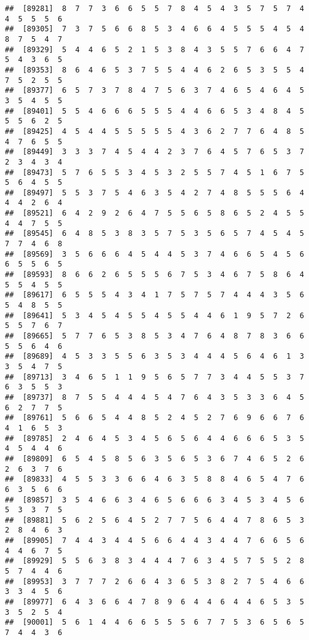 \documentclass[
]{book}
\begin{document}
\begin{verbatim}
##  [89281]  8  7  7  3  6  6  5  5  7  8  4  5  4  3  5  7  5  7  4  4  5  5  5  6
##  [89305]  7  3  7  5  6  6  8  5  3  4  6  6  4  5  5  5  4  5  4  8  7  5  4  7
##  [89329]  5  4  4  6  5  2  1  5  3  8  4  3  5  5  7  6  6  4  7  5  4  3  6  5
##  [89353]  8  6  4  6  5  3  7  5  5  4  4  6  2  6  5  3  5  5  4  7  5  2  5  5
##  [89377]  6  5  7  3  7  8  4  7  5  6  3  7  4  6  5  4  6  4  5  3  5  4  5  5
##  [89401]  5  5  4  6  6  6  5  5  5  4  4  6  6  5  3  4  8  4  5  5  5  6  2  5
##  [89425]  4  5  4  4  5  5  5  5  5  4  3  6  2  7  7  6  4  8  5  4  7  6  5  5
##  [89449]  3  3  3  7  4  5  4  4  2  3  7  6  4  5  7  6  5  3  7  2  3  4  3  4
##  [89473]  5  7  6  5  5  3  4  5  3  2  5  5  7  4  5  1  6  7  5  5  6  4  5  5
##  [89497]  5  5  3  7  5  4  6  3  5  4  2  7  4  8  5  5  5  6  4  4  4  2  6  4
##  [89521]  6  4  2  9  2  6  4  7  5  5  6  5  8  6  5  2  4  5  5  4  4  7  5  5
##  [89545]  6  4  8  5  3  8  3  5  7  5  3  5  6  5  7  4  5  4  5  7  7  4  6  8
##  [89569]  3  5  6  6  6  4  5  4  4  5  3  7  4  6  6  5  4  5  6  6  5  5  6  5
##  [89593]  8  6  6  2  6  5  5  5  6  7  5  3  4  6  7  5  8  6  4  5  5  4  5  5
##  [89617]  6  5  5  5  4  3  4  1  7  5  7  5  7  4  4  4  3  5  6  5  4  8  5  5
##  [89641]  5  3  4  5  4  5  5  4  5  5  4  4  6  1  9  5  7  2  6  5  5  7  6  7
##  [89665]  5  7  7  6  5  3  8  5  3  4  7  6  4  8  7  8  3  6  6  5  5  6  4  6
##  [89689]  4  5  3  3  5  5  6  3  5  3  4  4  4  5  6  4  6  1  3  3  5  4  7  5
##  [89713]  3  4  6  5  1  1  9  5  6  5  7  7  3  4  4  5  5  3  7  6  3  5  5  3
##  [89737]  8  7  5  5  4  4  4  5  4  7  6  4  3  5  3  3  6  4  5  6  2  7  7  5
##  [89761]  5  6  6  5  4  4  8  5  2  4  5  2  7  6  9  6  6  7  6  4  1  6  5  3
##  [89785]  2  4  6  4  5  3  4  5  6  5  6  4  4  6  6  6  5  3  5  4  5  4  4  6
##  [89809]  6  5  4  5  8  5  6  3  5  6  5  3  6  7  4  6  5  2  6  2  6  3  7  6
##  [89833]  4  5  5  3  3  6  6  4  6  3  5  8  8  4  6  5  4  7  6  6  3  5  6  6
##  [89857]  3  5  4  6  6  3  4  6  5  6  6  6  3  4  5  3  4  5  6  5  3  3  7  5
##  [89881]  5  6  2  5  6  4  5  2  7  7  5  6  4  4  7  8  6  5  3  2  8  4  6  3
##  [89905]  7  4  4  3  4  4  5  6  6  4  4  3  4  4  7  6  6  5  6  4  4  6  7  5
##  [89929]  5  5  6  3  8  3  4  4  4  7  6  3  4  5  7  5  5  2  8  5  7  4  4  6
##  [89953]  3  7  7  7  2  6  6  4  3  6  5  3  8  2  7  5  4  6  6  3  3  4  5  6
##  [89977]  6  4  3  6  6  4  7  8  9  6  4  4  6  4  4  6  5  3  5  3  5  2  5  4
##  [90001]  5  6  1  4  4  6  6  5  5  5  6  7  7  5  3  6  5  6  5  7  4  4  3  6

\end{verbatim}
\end{document}
